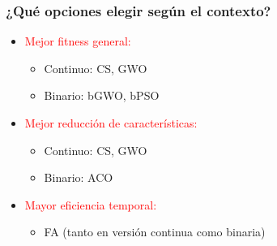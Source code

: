 \begin{frame}
\frametitle{¿Qué opciones elegir según el contexto?}
\begin{itemize}
\item<1-> \textcolor{red}{Mejor fitness general:}
    \begin{itemize}
    \item Continuo: CS, GWO
    \item Binario: bGWO, bPSO
    \end{itemize}
\item<2-> \textcolor{red}{Mejor reducción de características:}
    \begin{itemize}
    \item Continuo: CS, GWO
    \item Binario: ACO
    \end{itemize}
\item<3-> \textcolor{red}{Mayor eficiencia temporal:}
    \begin{itemize}
    \item FA (tanto en versión continua como binaria)
    \end{itemize}
\end{itemize}
\end{frame}